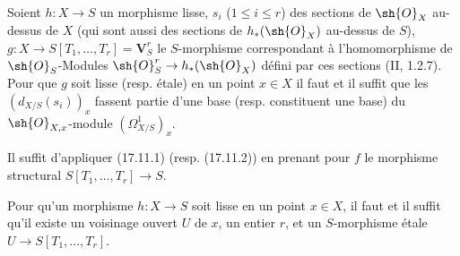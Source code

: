 \begin{corollary}[17.11.3]
\label{IV.17.11.3}
Soient $h:X\to S$ un morphisme lisse, $s_i$ ($1\leq i\leq r$) des sections de $\sh{O}_X$ au-dessus de $X$ (qui sont aussi des sections de $h_*(\sh{O}_X)$ au-dessus de $S$), $g:X\to S[T_1,\ldots,T_r]=\mathbf{V}_S^r$ le $S$-morphisme correspondant à l'homomorphisme de $\sh{O}_S$-Modules $\sh{O}_S^r\to h_*(\sh{O}_X)$ défini par ces sections (II, 1.2.7). Pour que $g$ soit lisse (resp. étale) en un point $x\in X$ il faut et il suffit que les $(d_{X/S}(s_i))_x$ fassent partie d'une base (resp. constituent une base) du $\sh{O}_{X,x}$-module $(\Omega^1_{X/S})_x$.
\end{corollary}

Il suffit d'appliquer (17.11.1) (resp. (17.11.2)) en prenant pour $f$ le morphisme structural $S[T_1,\ldots,T_r]\to S$.

\begin{corollary}[17.11.4]
\label{IV.17.11.4}
Pour qu'un morphisme $h:X\to S$ soit lisse en un point $x\in X$, il faut et il suffit qu'il existe un voisinage ouvert $U$ de $x$, un entier $r$, et un $S$-morphisme étale $U\to S[T_1,\ldots,T_r]$.
\end{corollary}

